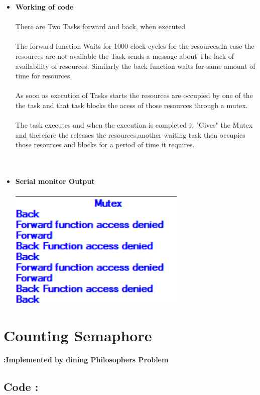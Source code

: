 \documentclass[11pt,a4paper]{book}
\begin{document}
\begin{itemize}
	\item \textbf{Working of code}
	\\
	\\
	There are Two Tasks forward and back, when executed
	\\
	\\
	The forward function Waits for 1000 clock cycles for the resources,In case the resources are not available the Task sends a message about The lack of availability of resources.
		Similarly the back function waits for same amount of time for resources.
	\\
	\\	
	As soon as execution of Tasks starts the resources are occupied by one of the the task and that task blocks the acess of those resources through a mutex.
	\\
	\\
The task executes and when the execution is completed it "Gives" the Mutex and therefore the releases the resources,another waiting task then occupies those resources and blocks for a period of time it requires.
	\\
	\\
	\\
	\item \textbf{Serial monitor Output} 
	\\
	\\
	\includegraphics[width=8.5cm]{mut}
\end{itemize}

\newpage 

\section{Counting Semaphore }

\textbf{:Implemented by dining Philosophers Problem}
\subsection{Code : }
	
\newpage
\end{document}
